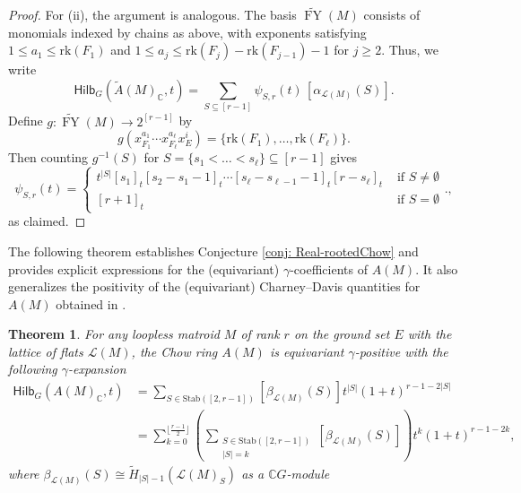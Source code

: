 \documentclass[reqno]{amsart}
\newcommand{\rk}{{\mathrm{rk}}}
\newcommand{\Stab}{{\mathrm{Stab}}}
\renewcommand{\L}{{\mathcal{L}}}
\newcommand{\Hilb}{{\mathsf{Hilb}}}
\newcommand{\floor}[1]{\lfloor #1 \rfloor}
\newcommand{\FY}{\operatorname{FY}}
\newtheorem{thm}{Theorem}[section]
\theoremstyle{definition}
\theoremstyle{remark}
\begin{document}
\begin{proof}
For (ii), the argument is analogous. The basis $\widetilde{\FY}(M)$ consists of monomials indexed by chains as above, with exponents satisfying
$1\le a_1\le \rk(F_1)$ and $1\le a_j\le \rk(F_j)-\rk(F_{j-1})-1$ for $j\ge 2$. 
Thus, we write
\[
\Hilb_G(\widetilde{A}(M)_{\mathbb{C}},t)
=\sum_{S\subseteq [r-1]} \psi_{S,r}(t)\,[\alpha_{\L(M)}(S)].
\]
Define $g:\widetilde{\FY}(M)\longrightarrow 2^{[r-1]}$ by
\[
g(x_{F_1}^{a_1}\cdots x_{F_\ell}^{a_\ell}x_E^i)
=\{\rk(F_1),\ldots,\rk(F_\ell)\}.
\]
Then counting $g^{-1}(S)$ for $S=\{s_1<\ldots<s_{\ell}\}\subseteq [r-1]$ gives 
\[
    \psi_{S,r}(t)=\begin{cases}
        t^{|S|}[s_1]_t[s_2-s_1-1]_t\cdots[s_{\ell}-s_{\ell-1}-1]_t[r-s_{\ell}]_t & \text{ if }S\neq \emptyset\\
        [r+1]_t & \text{ if } S=\emptyset
    \end{cases}.,
\]
as claimed.
\end{proof}

The following theorem establishes Conjecture \ref{conj: Real-rootedChow} and provides explicit expressions for the (equivariant) $\gamma$-coefficients of $A(M)$. It also generalizes the positivity of the (equivariant) Charney--Davis quantities for $A(M)$ obtained in \cite[Lemma~4.9]{Liao2023Two}.

\begin{thm} \label{thm:GammaChow}
For any loopless matroid $M$ of rank $r$ on the ground set $E$ with the lattice of flats $\L(M)$, the Chow ring $A(M)$ is equivariant $\gamma$-positive with the following $\gamma$-expansion
\begin{align*}
    \Hilb_{G}(A(M)_{\mathbb{C}},t) 
    &=\sum_{S\in\Stab([2,r-1])}[\beta_{\L(M)}(S)] t^{|S|}(1+t)^{r-1-2|S|}\\
    &=\sum_{k=0}^{\floor{\frac{r-1}{2}}}\left(\sum_{\substack{S\in\Stab([2,r-1])\\ |S|=k}}[\beta_{\L(M)}(S)]\right)t^k(1+t)^{r-1-2k},
\end{align*}
where $\beta_{\L(M)}(S)\cong \tilde{H}_{|S|-1}(\L(M)_S)$ as a $\mathbb{C}G$-module
\end{thm}
\end{document}
